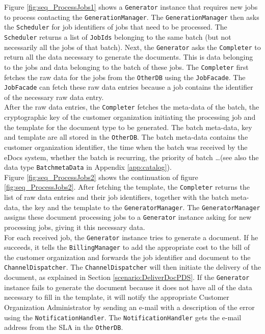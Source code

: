 \documentclass[a4paper,10pt]{article}
\begin{document}
Figure \ref{fig:seq_ProcessJobs1} shows a \texttt{Generator} instance that requires new jobs to process contacting the \texttt{GenerationManager}. The \texttt{GenerationManager} then asks the \texttt{Scheduler} for job identifiers of jobs that need to be processed. The \texttt{Scheduler} returns a list of \texttt{JobIds} belonging to the same batch (but not necessarily all the jobs of that batch). Next, the \texttt{Generator} asks the \texttt{Completer} to return all the data necessary to generate the documents. This is data belonging to the jobs and data belonging to the batch of these jobs. The \texttt{Completer} first fetches the raw data for the jobs from the \texttt{OtherDB} using the \texttt{JobFacade}. The \texttt{JobFacade} can fetch these raw data entries because a job contains the identifier of the necessary raw data entry.\\
After the raw data entries, the \texttt{Completer} fetches the meta-data of the batch, the cryptographic key of the customer organization initiating the processing job and the template for the document type to be generated. The batch meta-data, key and template are all stored in the \texttt{OtherDB}. The batch meta-data contains the customer organization identifier, the time when the batch was received by the eDocs system, whether the batch is recurring, the priority of batch \dots (see also the data type \texttt{BatchmetaData} in Appendix \ref{app:catalog}).\\

Figure \ref{fig:seq_ProcessJobs2} shows the continuation of figure \ref{fig:seq_ProcessJobs2}. After fetching the template, the \texttt{Completer} returns the list of raw data entries and their job identifiers, together with the batch meta-data, the key and the template to the \texttt{GeneratorManager}. The \texttt{GeneratorManager} assigns these document processing jobs to a \texttt{Generator} instance asking for new processing jobs, giving it this necessary data.\\
For each received job, the \texttt{Generator} instance tries to generate a document. If he succeeds, it tells the \texttt{BillingManager} to add the appropriate cost to the bill of the customer organization and forwards the job identifier and document to the \texttt{ChannelDispatcher}. The \texttt{ChannelDispatcher} will then initiate the delivery of the document, as explained in Section \ref{scenario:DeliverDocPDS}. If the \texttt{Generator} instance fails to generate the document because it does not have all of the data necessary to fill in the template, it will notify the appropriate Customer Organization Administrator by sending an  e-mail with a description of the error using the \texttt{NotificationHandler}. The \texttt{NotificationHandler} gets the e-mail address from the SLA in the \texttt{OtherDB}.
\end{document}
